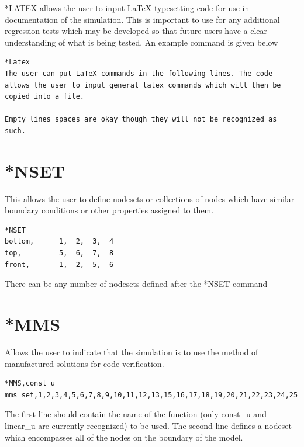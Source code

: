 \documentclass{asme2ej}
\begin{document}
*LATEX allows the user to input LaTeX typesetting code for use in documentation of the simulation. This is important to use for any additional regression tests which may be developed so that future users have a clear understanding of what is being tested. An example command is given below

\begin{verbatim}
*Latex
The user can put LaTeX commands in the following lines. The code allows the user to input general latex commands which will then be copied into a file.

Empty lines spaces are okay though they will not be recognized as such.
\end{verbatim}

\section{*NSET}

This allows the user to define nodesets or collections of nodes which have similar boundary conditions or other properties assigned to them.

\begin{verbatim}
*NSET
bottom,      1,  2,  3,  4
top,         5,  6,  7,  8
front,       1,  2,  5,  6
\end{verbatim}

There can be any number of nodesets defined after the *NSET command

\section{*MMS}

Allows the user to indicate that the simulation is to use the method of manufactured solutions for code verification.

\begin{verbatim}
*MMS,const_u
mms_set,1,2,3,4,5,6,7,8,9,10,11,12,13,15,16,17,18,19,20,21,22,23,24,25,26,27
\end{verbatim}

The first line should contain the name of the function (only const\_u and linear\_u are currently recognized) to be used. The second line defines a nodeset which encompasses all of the nodes on the boundary of the model.

\FloatBarrier



\end{document}
